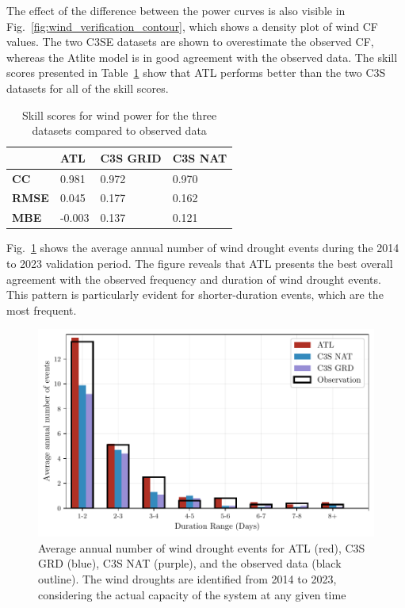 \documentclass[preprint, 12pt]{elsarticle}
\begin{document}
The effect of the difference between the power curves is also visible in Fig.~\ref{fig:wind_verification_contour}, which shows a density plot of wind CF values. The two C3SE datasets are shown to overestimate the observed CF, whereas the Atlite model is in good agreement with the observed data. The skill scores presented in Table~\ref{tab:wind_skill_scores} show that ATL performs better than the two C3S datasets for all of the skill scores. 

\begin{table}[!ht]
	\centering
	\begin{tabular}{l|lll|}
		\cline{2-4}
		& \textbf{ATL} & \textbf{C3S GRID} & \textbf{C3S NAT} \\ \hline
		\multicolumn{1}{|l|}{\textbf{CC}}   & 0.981           & 0.972            & 0.970            \\ \hline
		\multicolumn{1}{|l|}{\textbf{RMSE}} & 0.045           & 0.177            & 0.162            \\ \hline
		\multicolumn{1}{|l|}{\textbf{MBE}}   & -0.003          & 0.137            & 0.121            \\ \hline
	\end{tabular}
	\caption{Skill scores for wind power for the three datasets compared to observed data}
	\label{tab:wind_skill_scores}
\end{table}

Fig.~\ref{fig:bar_number_events_verification_wind} shows the average annual number of wind drought events during the 2014 to 2023 validation period. The figure reveals that ATL presents the best overall agreement with the observed frequency and duration of wind drought events. This pattern is particularly evident for shorter-duration events, which are the most frequent.

\begin{figure}[!ht]
	\centering
	\includegraphics[width=\textwidth]{verification_wind_number_events.pdf}
	\caption{Average annual number of wind drought events for ATL (red), C3S GRD (blue), C3S NAT (purple), and the observed data (black outline). The wind droughts are identified from 2014 to 2023, considering the actual capacity of the system at any given time}
	\label{fig:bar_number_events_verification_wind}
\end{figure}
\end{document}
